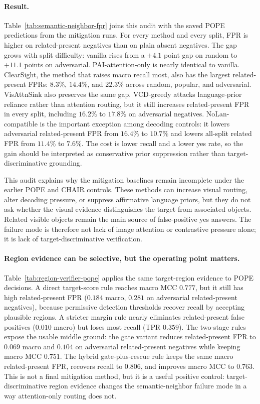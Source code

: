

\paragraph{Result.}
Table~\ref{tab:semantic-neighbor-fpr} joins this audit with the saved POPE predictions from the mitigation runs. For every method and every split, FPR is higher on related-present negatives than on plain absent negatives. The gap grows with split difficulty: vanilla rises from a $+4.1$ point gap on random to $+11.1$ points on adversarial. PAI-attention-only is nearly identical to vanilla. ClearSight, the method that raises macro recall most, also has the largest related-present FPRs: $8.3\%$, $14.4\%$, and $22.3\%$ across random, popular, and adversarial. VisAttnSink also preserves the same gap. VCD-greedy attacks language-prior reliance rather than attention routing, but it still increases related-present FPR in every split, including $16.2\%$ to $17.8\%$ on adversarial negatives. NoLan-compatible is the important exception among decoding controls: it lowers adversarial related-present FPR from $16.4\%$ to $10.7\%$ and lowers all-split related FPR from $11.4\%$ to $7.6\%$. The cost is lower recall and a lower yes rate, so the gain should be interpreted as conservative prior suppression rather than target-discriminative grounding.

This audit explains why the mitigation baselines remain incomplete under the earlier POPE and CHAIR controls. These methods can increase visual routing, alter decoding pressure, or suppress affirmative language priors, but they do not ask whether the visual evidence distinguishes the target from associated objects. Related visible objects remain the main source of false-positive yes answers. The failure mode is therefore not lack of image attention or contrastive pressure alone; it is lack of target-discriminative verification.



\paragraph{Region evidence can be selective, but the operating point matters.}
Table~\ref{tab:region-verifier-pope} applies the same target-region evidence to POPE decisions. A direct target-score rule reaches macro MCC $0.777$, but it still has high related-present FPR ($0.184$ macro, $0.281$ on adversarial related-present negatives), because permissive detection thresholds recover recall by accepting plausible regions. A stricter margin rule nearly eliminates related-present false positives ($0.010$ macro) but loses most recall (TPR $0.359$). The two-stage rules expose the usable middle ground: the gate variant reduces related-present FPR to $0.069$ macro and $0.104$ on adversarial related-present negatives while keeping macro MCC $0.751$. The hybrid gate-plus-rescue rule keeps the same macro related-present FPR, recovers recall to $0.806$, and improves macro MCC to $0.763$. This is not a final mitigation method, but it is a useful positive control: target-discriminative region evidence changes the semantic-neighbor failure mode in a way attention-only routing does not.
